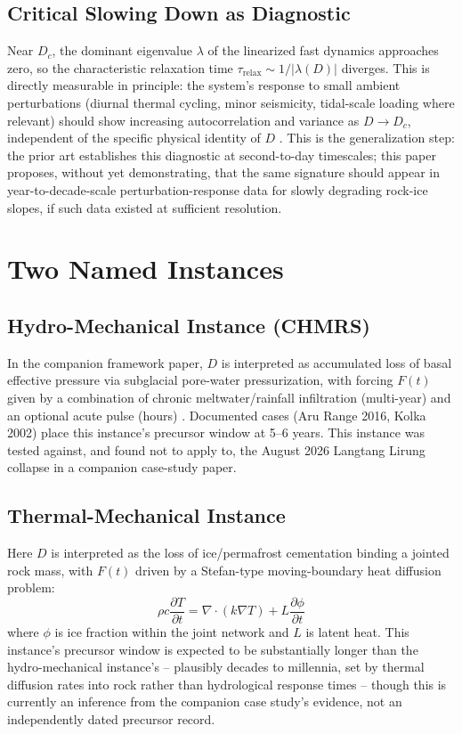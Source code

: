 \documentclass[11pt,twocolumn]{article}
\begin{document}
\subsection{Critical Slowing Down as Diagnostic}
Near $D_c$, the dominant eigenvalue $\lambda$ of the linearized fast dynamics approaches zero, so the characteristic relaxation time $\tau_{\text{relax}} \sim 1/|\lambda(D)|$ diverges. This is directly measurable in principle: the system's response to small ambient perturbations (diurnal thermal cycling, minor seismicity, tidal-scale loading where relevant) should show increasing autocorrelation and variance as $D \to D_c$, independent of the specific physical identity of $D$ \cite{scheffer2009,tang2022,fan2025}. This is the generalization step: the prior art establishes this diagnostic at second-to-day timescales; this paper proposes, without yet demonstrating, that the same signature should appear in year-to-decade-scale perturbation-response data for slowly degrading rock-ice slopes, if such data existed at sufficient resolution.

\section{Two Named Instances}

\subsection{Hydro-Mechanical Instance (CHMRS)}
In the companion framework paper, $D$ is interpreted as accumulated loss of basal effective pressure via subglacial pore-water pressurization, with forcing $F(t)$ given by a combination of chronic meltwater/rainfall infiltration (multi-year) and an optional acute pulse (hours) \cite{gilbert2018,kaab2018}. Documented cases (Aru Range 2016, Kolka 2002) place this instance's precursor window at 5--6 years. This instance was tested against, and found not to apply to, the August 2026 Langtang Lirung collapse in a companion case-study paper.

\subsection{Thermal-Mechanical Instance}
Here $D$ is interpreted as the loss of ice/permafrost cementation binding a jointed rock mass, with $F(t)$ driven by a Stefan-type moving-boundary heat diffusion problem:
\begin{equation}
\rho c \frac{\partial T}{\partial t} = \nabla\cdot(k\nabla T) + L\frac{\partial \phi}{\partial t}
\end{equation}
where $\phi$ is ice fraction within the joint network and $L$ is latent heat. This instance's precursor window is expected to be substantially longer than the hydro-mechanical instance's -- plausibly decades to millennia, set by thermal diffusion rates into rock rather than hydrological response times -- though this is currently an inference from the companion case study's evidence, not an independently dated precursor record.
\end{document}
